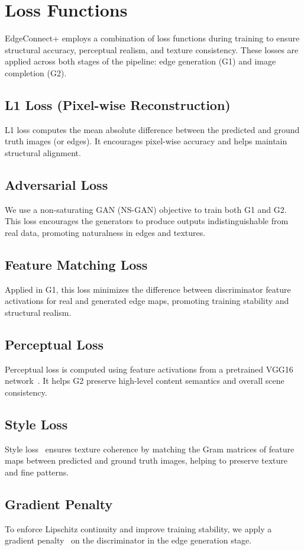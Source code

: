 \section{Loss Functions}

EdgeConnect+ employs a combination of loss functions during training to ensure structural accuracy, perceptual realism, and texture consistency. These losses are applied across both stages of the pipeline: edge generation (G1) and image completion (G2).

\subsection{L1 Loss (Pixel-wise Reconstruction)}
L1 loss computes the mean absolute difference between the predicted and ground truth images (or edges). It encourages pixel-wise accuracy and helps maintain structural alignment.

\subsection{Adversarial Loss}
We use a non-saturating GAN (NS-GAN) objective to train both G1 and G2. This loss encourages the generators to produce outputs indistinguishable from real data, promoting naturalness in edges and textures.

\subsection{Feature Matching Loss}
Applied in G1, this loss minimizes the difference between discriminator feature activations for real and generated edge maps, promoting training stability and structural realism.

\subsection{Perceptual Loss}
Perceptual loss is computed using feature activations from a pretrained VGG16 network~\cite{johnson2016perceptual}. It helps G2 preserve high-level content semantics and overall scene consistency.

\subsection{Style Loss}
Style loss~\cite{gatys2016image} ensures texture coherence by matching the Gram matrices of feature maps between predicted and ground truth images, helping to preserve texture and fine patterns.

\subsection{Gradient Penalty}
To enforce Lipschitz continuity and improve training stability, we apply a gradient penalty~\cite{gulrajani2017improved} on the discriminator in the edge generation stage.